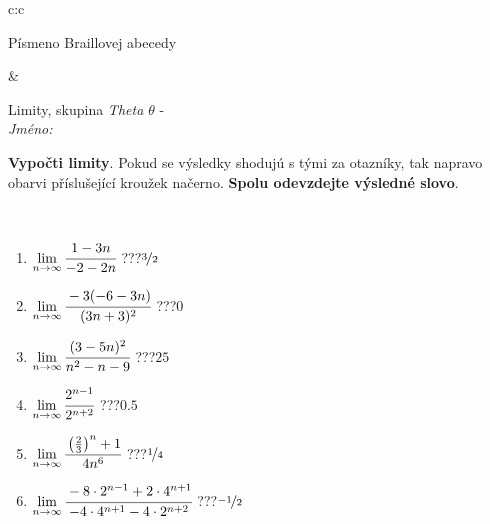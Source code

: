 \documentclass[10pt]{report}
\begin{document}
\begin{tabular}{c:c}
\begin{minipage}[c][104.5mm][t]{0.5\linewidth}
\begin{center}
\begin{minipage}{0.20\linewidth}
\begin{center}
{\small Písmeno Braillovej abecedy}
\end{center}
\end{minipage}
\end{center}
\end{minipage}
&
\begin{minipage}[c][104.5mm][t]{0.5\linewidth}
\begin{center}
\vspace{7mm}
{\huge Limity, skupina \textit{Theta $\theta$} -}\\[5mm]
\textit{Jméno:}\phantom{xxxxxxxxxxxxxxxxxxxxxxxxxxxxxxxxxxxxxxxxxxxxxxxxxxxxxxxxxxxxxxxxx}\\[5mm]
\begin{minipage}{0.95\linewidth}
\begin{center}
\textbf{Vypočti limity}. Pokud se výsledky shodujú s tými za otazníky, tak napravo\\obarvi příslušející kroužek načerno. \textbf{Spolu odevzdejte výsledné slovo}.
\end{center}
\end{minipage}
\\[1mm]
\begin{minipage}{0.79\linewidth}
\begin{center}
\begin{varwidth}{\linewidth}
\begin{enumerate}
\normalsize
\item $\lim\limits_{n\to\infty}\cfrac{1-3n}{-2-2n}$\quad \dotfill\; ???\;\dotfill \quad $\nicefrac{3}{2}$
\item $\lim\limits_{n\to\infty}\cfrac{-3(-6-3n)}{(3n+3)^2}$\quad \dotfill\; ???\;\dotfill \quad $0$
\item $\lim\limits_{n\to\infty}\cfrac{(3-5n)^2}{n^2-n-9}$\quad \dotfill\; ???\;\dotfill \quad $25$
\item $\lim\limits_{n\to\infty}\cfrac{2^{n-1}}{2^{n+2}}$\quad \dotfill\; ???\;\dotfill \quad $0.5$
\item $\lim\limits_{n\to\infty}\cfrac{\left(\frac{2}{3}\right)^n +1}{4n^{6}}$\quad \dotfill\; ???\;\dotfill \quad $\nicefrac{1}{4}$
\item $\lim\limits_{n\to\infty}\cfrac{-8\cdot 2^{n-1}+2\cdot 4^{n+1}}{-4\cdot 4^{n+1}-4\cdot 2^{n+2}}$\quad \dotfill\; ???\;\dotfill \quad $\nicefrac{-1}{2}$
\end{enumerate}
\end{varwidth}
\end{center}
\end{minipage}

\end{center}
\end{minipage}
\end{tabular}
\end{document}
